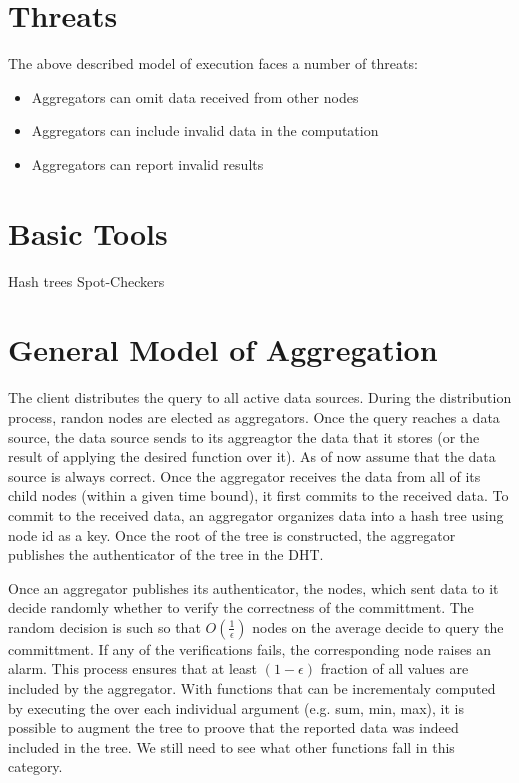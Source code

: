 \documentclass{article}
\begin{document}
\section{Threats}
The above described model of execution faces a number of threats:
\begin{itemize}
  \item Aggregators can omit data received from other nodes
  \item Aggregators can include invalid data in the computation
  \item Aggregators can report invalid results
\end{itemize}


\section{Basic Tools}
Hash trees
Spot-Checkers

\section{General Model of Aggregation}
The client distributes the query to all active data sources. During
the distribution process, randon nodes are elected as
aggregators. Once the query reaches a data source, the data source
sends to its aggreagtor the data that it stores (or the result of
applying the desired function over it). As of now assume that the data
source is always correct. Once the aggregator receives the data from
all of its child nodes (within a given time bound), it first commits
to the received data. To commit to the received data, an aggregator
organizes data into a hash tree using node id as a key. Once the root
of the tree is constructed, the aggregator publishes the authenticator
of the tree in the DHT. 

Once an aggregator publishes its authenticator, the nodes, which sent
data to it decide randomly whether to verify the correctness of the
committment. The random decision is such so that
$O(\frac{1}{\epsilon})$ nodes on the average decide to query the
committment. If any of the verifications fails, the corresponding node
raises an alarm. This process ensures that at least $(1-\epsilon)$
fraction of all values are included by the aggregator. With functions
that can be incrementaly computed by executing the over each
individual argument (e.g. sum, min, max), it is possible to augment
the tree to proove that the reported data was indeed included in the
tree. We still need to see what other functions fall in this category.
\end{document}

